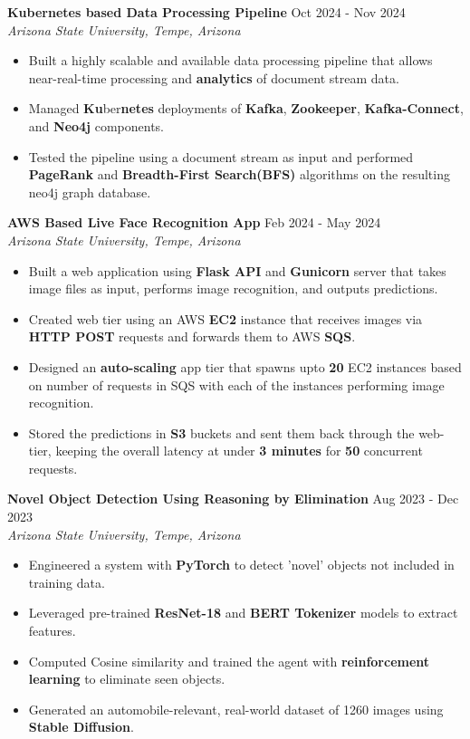 \documentclass[a4paper,9pt]{extarticle}
\begin{document}
\textbf{Kubernetes based Data Processing Pipeline}  \hfill Oct 2024 - Nov 2024\\ %
\textit{Arizona State University, Tempe, Arizona} %
\begin{itemize}
    \item Built a highly scalable and available data processing pipeline that allows near-real-time processing and \textbf{analytics} of document stream data.
    \item Managed \textbf{Ku}ber\textbf{netes} deployments of \textbf{Kafka}, \textbf{Zookeeper}, \textbf{Kafka-Connect}, and \textbf{Neo4j} components.
    \item Tested the pipeline using a document stream as input and performed \textbf{PageRank} and \textbf{Breadth-First Search(BFS)} algorithms on the resulting neo4j graph database. 
    
\end{itemize}

\noindent
\textbf{AWS Based Live Face Recognition App}  \hfill Feb 2024 - May 2024\\ %
\textit{Arizona State University, Tempe, Arizona} %
\begin{itemize}
    \item Built a web application using \textbf{Flask API} and \textbf{Gunicorn} server that takes image files as input, performs image recognition, and outputs predictions.
    \item Created web tier using an AWS \textbf{EC2} instance that receives images via \textbf{HTTP POST} requests and forwards them to AWS \textbf{SQS}.
    \item Designed an \textbf{auto-scaling} app tier that spawns upto \textbf{20} EC2 instances based on number of requests in SQS with each of the instances performing image recognition.
    \item Stored the predictions in \textbf{S3} buckets and sent them back through the web-tier, keeping the overall latency at under \textbf{3 minutes} for \textbf{50} concurrent requests.
    
\end{itemize}

\noindent
\textbf{Novel Object Detection Using Reasoning by Elimination} \hfill Aug 2023 - Dec 2023\\%
\textit{Arizona State University, Tempe, Arizona}
\begin{itemize}
    \item Engineered a system with \textbf{PyTorch} to detect 'novel' objects not included in training data.
    \item Leveraged pre-trained \textbf{ResNet-18} and \textbf{BERT Tokenizer} models to extract features. 
    \item Computed Cosine similarity and trained the agent with \textbf{reinforcement learning} to eliminate seen objects.
    \item Generated an automobile-relevant, real-world dataset of 1260 images using \textbf{Stable Diffusion}. %
\end{itemize}


\end{document}
